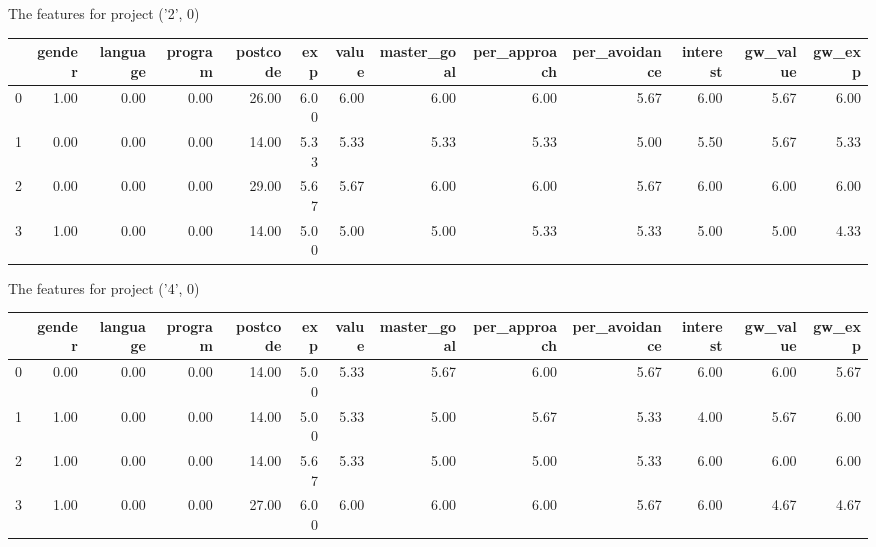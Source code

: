 \documentclass[7pt]{article}
\begin{document}
\begin{landscape}
The features for project ('2', 0)\newline
\begin{tabular}{lrrrrrrrrrrrr}
\toprule
{} &  gender &  language &  program &  postcode &  exp &  value &  master\_goal &  per\_approach &  per\_avoidance &  interest &  gw\_value &  gw\_exp \\
\midrule
0 &    1.00 &      0.00 &     0.00 &     26.00 & 6.00 &   6.00 &         6.00 &          6.00 &           5.67 &      6.00 &             5.67 &           6.00 \\
1 &    0.00 &      0.00 &     0.00 &     14.00 & 5.33 &   5.33 &         5.33 &          5.33 &           5.00 &      5.50 &             5.67 &           5.33 \\
2 &    0.00 &      0.00 &     0.00 &     29.00 & 5.67 &   5.67 &         6.00 &          6.00 &           5.67 &      6.00 &             6.00 &           6.00 \\
3 &    1.00 &      0.00 &     0.00 &     14.00 & 5.00 &   5.00 &         5.00 &          5.33 &           5.33 &      5.00 &             5.00 &           4.33 \\
\bottomrule
\end{tabular}

The features for project ('4', 0)\newline
\begin{tabular}{lrrrrrrrrrrrr}
\toprule
{} &  gender &  language &  program &  postcode &  exp &  value &  master\_goal &  per\_approach &  per\_avoidance &  interest &  gw\_value &  gw\_exp \\
\midrule
0 &    0.00 &      0.00 &     0.00 &     14.00 & 5.00 &   5.33 &         5.67 &          6.00 &           5.67 &      6.00 &             6.00 &           5.67 \\
1 &    1.00 &      0.00 &     0.00 &     14.00 & 5.00 &   5.33 &         5.00 &          5.67 &           5.33 &      4.00 &             5.67 &           6.00 \\
2 &    1.00 &      0.00 &     0.00 &     14.00 & 5.67 &   5.33 &         5.00 &          5.00 &           5.33 &      6.00 &             6.00 &           6.00 \\
3 &    1.00 &      0.00 &     0.00 &     27.00 & 6.00 &   6.00 &         6.00 &          6.00 &           5.67 &      6.00 &             4.67 &           4.67 \\
\bottomrule
\end{tabular}


\end{landscape}
\end{document}
